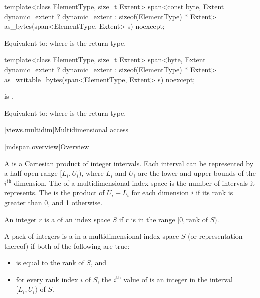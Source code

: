 %
\begin{itemdecl}
template<class ElementType, size_t Extent>
  span<const byte, Extent == dynamic_extent ? dynamic_extent : sizeof(ElementType) * Extent>
    as_bytes(span<ElementType, Extent> s) noexcept;
\end{itemdecl}

\begin{itemdescr}
\pnum
\effects
Equivalent to: 
where  is the return type.
\end{itemdescr}

%
\begin{itemdecl}
template<class ElementType, size_t Extent>
  span<byte, Extent == dynamic_extent ? dynamic_extent : sizeof(ElementType) * Extent>
    as_writable_bytes(span<ElementType, Extent> s) noexcept;
\end{itemdecl}

\begin{itemdescr}
\pnum
\constraints
{} is .

\pnum
\effects
Equivalent to: 
where  is the return type.
\end{itemdescr}

[views.multidim]{Multidimensional access}

[mdspan.overview]{Overview}

\pnum
A  is
a Cartesian product of integer intervals.
Each interval can be represented by a half-open range $[L_i, U_i)$,
where $L_i$ and $U_i$ are the lower and upper bounds of
the $i^\text{th}$ dimension.
The  of a multidimensional index space is
the number of intervals it represents.
The  is
the product of $U_i - L_i$ for each dimension $i$
if its rank is greater than 0, and 1 otherwise.

\pnum
An integer $r$ is a  of an index space $S$
if $r$ is in the range $[0, \text{rank of $S$})$.

\pnum
A pack of integers  is
a  in a multidimensional index space $S$
(or representation thereof) if both of the following are true:
\begin{itemize}
\item
{} is equal to the rank of $S$, and
\item
for every rank index $i$ of $S$,
the $i^\text{th}$ value of  is an integer
in the interval $[L_i, U_i)$ of $S$.
\end{itemize}

